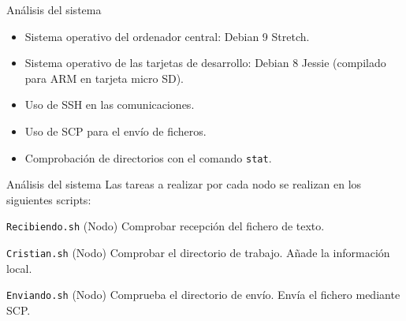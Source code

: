 \documentclass[aspectratio=169]{beamer}
\begin{document}
\begin{frame}{Análisis del sistema}
	\begin{itemize}
		\item Sistema operativo del ordenador central: Debian 9 Stretch.
		\item Sistema operativo de las tarjetas de desarrollo: Debian 8 Jessie (compilado para ARM en tarjeta micro SD).
		\item Uso de SSH en las comunicaciones.
		\item Uso de SCP para el envío de ficheros.
		\item Comprobación de directorios con el comando \texttt{stat}.
	\end{itemize}
\end{frame}

\begin{frame}{Análisis del sistema}
	Las tareas a realizar por cada nodo se realizan en los siguientes scripts:
	\begin{block}{\texttt{Recibiendo.sh} (Nodo)}
		Comprobar recepción del fichero de texto.
	\end{block}
	\begin{block}{\texttt{Cristian.sh} (Nodo)}
		Comprobar el directorio de trabajo.
		Añade la información local.
	\end{block}
	\begin{block}{\texttt{Enviando.sh} (Nodo)}
		Comprueba el directorio de envío.
		Envía el fichero mediante SCP.
	\end{block}
\end{frame}
\end{document}
